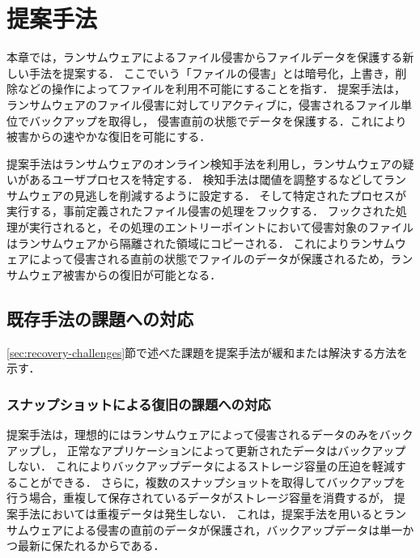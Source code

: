 \chapter{提案手法}
\label{chap:approach}
本章では，ランサムウェアによるファイル侵害からファイルデータを保護する新しい手法を提案する．
ここでいう「ファイルの侵害」とは暗号化，上書き，削除などの操作によってファイルを利用不可能にすることを指す．
提案手法は，ランサムウェアのファイル侵害に対してリアクティブに，侵害されるファイル単位でバックアップを取得し，
侵害直前の状態でデータを保護する．これにより被害からの速やかな復旧を可能にする．

提案手法はランサムウェアのオンライン検知手法を利用し，ランサムウェアの疑いがあるユーザプロセスを特定する．
検知手法は閾値を調整するなどしてランサムウェアの見逃しを削減するように設定する．
そして特定されたプロセスが実行する，事前定義されたファイル侵害の処理をフックする．
フックされた処理が実行されると，その処理のエントリーポイントにおいて侵害対象のファイルはランサムウェアから隔離された領域にコピーされる．
これによりランサムウェアによって侵害される直前の状態でファイルのデータが保護されるため，ランサムウェア被害からの復旧が可能となる．

\section{既存手法の課題への対応}
\ref{sec:recovery-challenges}節で述べた課題を提案手法が緩和または解決する方法を示す．
\subsection{スナップショットによる復旧の課題への対応}
提案手法は，理想的にはランサムウェアによって侵害されるデータのみをバックアップし，
正常なアプリケーションによって更新されたデータはバックアップしない．
これによりバックアップデータによるストレージ容量の圧迫を軽減することができる．
さらに，複数のスナップショットを取得してバックアップを行う場合，重複して保存されているデータがストレージ容量を消費するが，
提案手法においては重複データは発生しない．
これは，提案手法を用いるとランサムウェアによる侵害の直前のデータが保護され，バックアップデータは単一かつ最新に保たれるからである．

